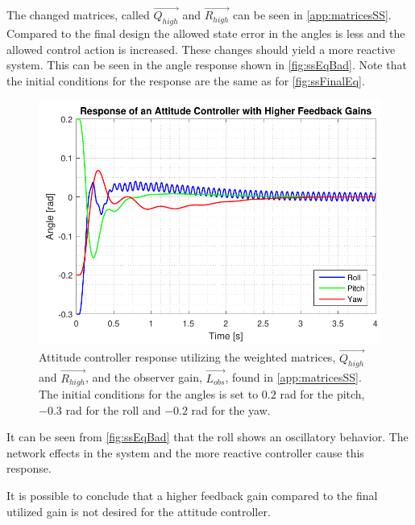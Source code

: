 The changed matrices, called $\vec{Q_{high}}$ and $\vec{R_{high}}$ can be seen in \autoref{app:matricesSS}. Compared to the final design the allowed state error in the angles is less and the allowed control action is increased. These changes should yield a more reactive system. This can be seen in the angle response shown in \autoref{fig:ssEqBad}. Note that the initial conditions for the response are the same as for \autoref{fig:ssFinalEq}.
%
\begin{figure}[H]
	\centering
	\includegraphics[scale=0.7]{figures/ssEqBad.pdf}
	\caption{Attitude controller response utilizing the weighted matrices, $\vec{Q_{high}}$ and $\vec{R_{high}}$, and the observer gain, $\vec{L_{obs}}$, found in \autoref{app:matricesSS}. The initial conditions for the angles is set to $0.2$ rad for the pitch, $-0.3$ rad for the roll and $-0.2$ rad for the yaw.}
	\label{fig:ssEqBad}
\end{figure}
%
It can be seen from \autoref{fig:ssEqBad} that the roll shows an oscillatory behavior. The network effects in the system and the more reactive controller cause this response.%

It is possible to conclude that a higher feedback gain compared to the final utilized gain is not desired for the attitude controller.

